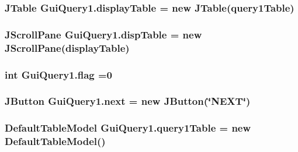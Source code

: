 \subsubsection[{\texorpdfstring{display\+Table}{displayTable}}]{\setlength{\rightskip}{0pt plus 5cm}J\+Table Gui\+Query1.\+display\+Table = new J\+Table({\bf query1\+Table})\hspace{0.3cm}{\ttfamily [protected]}}\hypertarget{classGuiQuery1_aa23b7fb33949ccf74ca5be46e85eb578}{}\label{classGuiQuery1_aa23b7fb33949ccf74ca5be46e85eb578}
\subsubsection[{\texorpdfstring{disp\+Table}{dispTable}}]{\setlength{\rightskip}{0pt plus 5cm}J\+Scroll\+Pane Gui\+Query1.\+disp\+Table = new J\+Scroll\+Pane({\bf display\+Table})\hspace{0.3cm}{\ttfamily [protected]}}\hypertarget{classGuiQuery1_aaa4f69c2faaffb0b451f1fa5bfebc4d3}{}\label{classGuiQuery1_aaa4f69c2faaffb0b451f1fa5bfebc4d3}
\subsubsection[{\texorpdfstring{flag}{flag}}]{\setlength{\rightskip}{0pt plus 5cm}int Gui\+Query1.\+flag =0\hspace{0.3cm}{\ttfamily [protected]}}\hypertarget{classGuiQuery1_a46ee2c343bc43a1c9a6278d9520b31f2}{}\label{classGuiQuery1_a46ee2c343bc43a1c9a6278d9520b31f2}
\subsubsection[{\texorpdfstring{next}{next}}]{\setlength{\rightskip}{0pt plus 5cm}J\+Button Gui\+Query1.\+next = new J\+Button(\char`\"{}N\+E\+XT\char`\"{})\hspace{0.3cm}{\ttfamily [protected]}}\hypertarget{classGuiQuery1_a0ef1bc892139ef28ea2e6c464f78e881}{}\label{classGuiQuery1_a0ef1bc892139ef28ea2e6c464f78e881}
\subsubsection[{\texorpdfstring{query1\+Table}{query1Table}}]{\setlength{\rightskip}{0pt plus 5cm}Default\+Table\+Model Gui\+Query1.\+query1\+Table = new Default\+Table\+Model()\hspace{0.3cm}{\ttfamily [protected]}}\hypertarget{classGuiQuery1_ab9463b1a4a59d6c13bc04963b2b3f2c2}{}\label{classGuiQuery1_ab9463b1a4a59d6c13bc04963b2b3f2c2}

